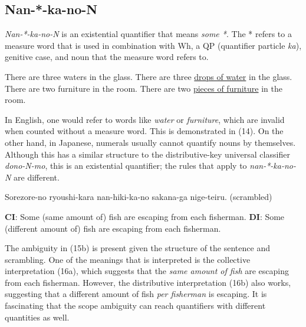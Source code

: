 \documentclass[english, 11pt]{article}
\begin{document}
\subsection{Nan-*-ka-no-N}
\emph{Nan-*-ka-no-N} is an existential quantifier that means \emph{some *}. The * refers to a measure word that is used in combination with Wh, a QP (quantifier particle \emph{ka}), genitive case, and noun that the measure word refers to. 
\begin {exe}
	\ex 
		\begin {xlist}
			\ex *There are three waters in the glass.
			\ex There are three \underline{drops of water} in the glass.
			\ex *There are two furniture in the room.
			\ex There are two \underline{pieces of furniture} in the room.
	\end {xlist}
\end {exe}
In English, one would refer to words like \emph{water} or \emph{furniture}, which are invalid when counted without a measure word. This is demonstrated in (14). On the other hand, in Japanese, numerals usually cannot quantify nouns by themselves. Although this has a similar structure to the distributive-key universal classifier \emph{dono-N-mo}, this is an existential quantifier; the rules that apply to \emph{nan-*-ka-no-N} are different. 
\begin{exe}
	\ex 
	\begin{xlist}
		\label{1a}
		\label{1a}
	\end{xlist}
\end{exe}
\begin {exe}
	\ex Sorezore-no ryoushi-kara nan-hiki-ka-no sakana-ga nige-teiru. (scrambled)
		\begin {xlist} 
			\ex \textbf{CI}: Some (same amount of) fish are escaping from each fisherman.
			\ex \textbf{DI}: Some (different amount of) fish are escaping from each fisherman.
		\end {xlist}
\end {exe}
The ambiguity in (15b) is present given the structure of the sentence and scrambling. One of the meanings that is interpreted is the collective interpretation (16a), which suggests that the \emph{same amount of fish} are escaping from each fisherman. However, the distributive interpretation (16b) also works, suggesting that a different amount of fish \emph{per fisherman} is escaping. It is fascinating that the scope ambiguity can reach quantifiers with different quantities as well. 
\pagebreak
\end{document}
